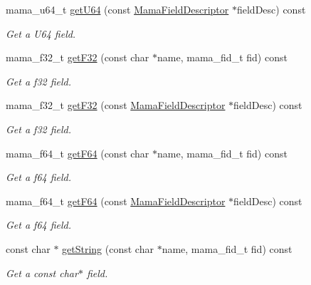 \begin{DoxyCompactItemize}
mama\_\-u64\_\-t \hyperlink{classWombat_1_1MamaMsg_a0a09c24df619df060452d4e40b370ef0}{getU64} (const \hyperlink{classWombat_1_1MamaFieldDescriptor}{MamaFieldDescriptor} $\ast$fieldDesc) const 
\begin{DoxyCompactList}\small\item\em Get a U64 field. \item\end{DoxyCompactList}\item 
mama\_\-f32\_\-t \hyperlink{classWombat_1_1MamaMsg_a3c4c5a9d90fd6fd6e51d69a14505c28c}{getF32} (const char $\ast$name, mama\_\-fid\_\-t fid) const 
\begin{DoxyCompactList}\small\item\em Get a f32 field. \item\end{DoxyCompactList}\item 
mama\_\-f32\_\-t \hyperlink{classWombat_1_1MamaMsg_a7d6c83e3d2527999bcd5099076401927}{getF32} (const \hyperlink{classWombat_1_1MamaFieldDescriptor}{MamaFieldDescriptor} $\ast$fieldDesc) const 
\begin{DoxyCompactList}\small\item\em Get a f32 field. \item\end{DoxyCompactList}\item 
mama\_\-f64\_\-t \hyperlink{classWombat_1_1MamaMsg_a13b0a57a9b0546fe48b63401f5250450}{getF64} (const char $\ast$name, mama\_\-fid\_\-t fid) const 
\begin{DoxyCompactList}\small\item\em Get a f64 field. \item\end{DoxyCompactList}\item 
mama\_\-f64\_\-t \hyperlink{classWombat_1_1MamaMsg_afa2fbcd4d9e164ba1d8926f74abc7f13}{getF64} (const \hyperlink{classWombat_1_1MamaFieldDescriptor}{MamaFieldDescriptor} $\ast$fieldDesc) const 
\begin{DoxyCompactList}\small\item\em Get a f64 field. \item\end{DoxyCompactList}\item 
const char $\ast$ \hyperlink{classWombat_1_1MamaMsg_a0de8f4845b9c00ed88aa28817940305f}{getString} (const char $\ast$name, mama\_\-fid\_\-t fid) const 
\begin{DoxyCompactList}\small\item\em Get a const char$\ast$ field. \item\end{DoxyCompactList}\item 

\end{DoxyCompactItemize}
